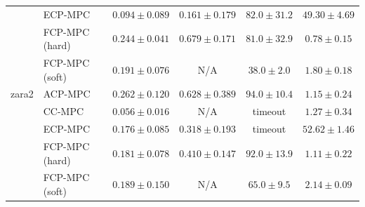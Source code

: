\begin{tabular}{llcccc}
 & ECP-MPC~\cite{shin2025egocentric} & $0.094\pm0.089$ & $\mathbf{0.161}\pm0.179$ & $82.0\pm31.2$ & $49.30\pm4.69$ \\
 & FCP-MPC (hard) & $0.244\pm0.041$ & $0.679\pm0.171$ & $81.0\pm32.9$ & $\mathbf{0.78}\pm0.15$ \\
 & FCP-MPC (soft) & $0.191\pm0.076$ & N/A & $\mathbf{38.0}\pm2.0$ & $1.80\pm0.18$ \\
\hline
zara2 & ACP-MPC~\cite{dixit2023adaptive} & $0.262\pm0.120$ & $0.628\pm0.389$ & $94.0\pm10.4$ & $1.15\pm0.24$ \\
 & CC-MPC~\cite{lekeufack2024decision} & $\mathbf{0.056}\pm0.016$ & N/A & timeout & $1.27\pm0.34$ \\
 & ECP-MPC~\cite{shin2025egocentric} & $0.176\pm0.085$ & $\mathbf{0.318}\pm0.193$ & timeout & $52.62\pm1.46$ \\
 & FCP-MPC (hard) & $0.181\pm0.078$ & $0.410\pm0.147$ & $92.0\pm13.9$ & $\mathbf{1.11}\pm0.22$ \\
 & FCP-MPC (soft) & $0.189\pm0.150$ & N/A & $\mathbf{65.0}\pm9.5$ & $2.14\pm0.09$ \\
\hline
\end{tabular}